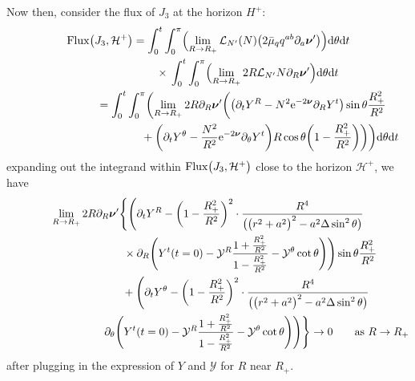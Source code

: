 \documentclass[11pt]{article}
\numberwithin{equation}{section}
\def\ptl{\partial}%
\def\mbo#1{\boldsymbol{#1}}%
\numberwithin{equation}{section}
\begin{document}
Now then, consider the flux of $J_3$ at the horizon $H^+$:
\begin{gather*}
{\rm Flux} \bigl(J_3, \mathcal{H}^+\bigr) = \int^t_0 \int^\pi _0 \Bigl(\lim_{R \to R_+} \mathcal{L}_{N'} (N) \bigl(2 \bar{\mu}_q q^{ab} \ptl_a \mbo{\nu}'\bigr) \Bigr) {\rm d}\theta {\rm d}t \notag\\
 \hphantom{{\rm Flux} \bigl(J_3, \mathcal{H}^+\bigr) =}{}
\times{}\int^t_0 \int^\pi_0 \Bigl(\lim_{R \to R_+} 2 R \mathcal{L}_{N'} N \ptl_R \mbo{\nu}' \Bigr) {\rm d}\theta {\rm d}t \notag\\
 \hphantom{{\rm Flux} \bigl(J_3, \mathcal{H}^+\bigr)}{}
= \int^t_0 \int^\pi _0 \biggl(\lim_{R \to R_+} 2 R \ptl_R \mbo{\nu}' \biggl(\bigl(\ptl_t Y^R - N^2 {\rm e}^{-2 \mbo{\nu}} \ptl_R Y^t\bigr) \sin \theta \frac{R^2_+}{R^2} \notag\\
 \hphantom{{\rm Flux} \bigl(J_3, \mathcal{H}^+\bigr)= \int^t_0 \int^\pi _0 \biggl(}{}
 + \biggl(\ptl_t Y^\theta - \frac{N^2}{R^2} {\rm e}^{-2 \mbo{\nu}} \ptl_\theta Y^t\biggr) R \cos \theta \biggl(1-\frac{R^2_+}{R^2}\biggr) \biggr) \biggr) {\rm d}\theta {\rm d}t
\end{gather*}
expanding out the integrand within $ {\rm Flux} \bigl(J_3, \mathcal{H}^+\bigr)$ close to the horizon $\mathcal{H}^+$, we have
\begin{gather*}
 \lim_{R \to R_+} 2R \ptl_R \mbo{\nu}' \Bigg\{ \Biggl(\ptl_t Y^R - \biggl(1 - \frac{R^2_+}{R^2} \biggr)^2 \cdot \frac{R^4}{ \bigl(\bigl(r^2+a^2\bigr)^2 -a^2 \Delta \sin^2 \theta\bigr)} \\
 \hphantom{\lim_{R \to R_+} 2R \ptl_R \mbo{\nu}' \Bigg\{\Biggl(}{}
 \times \ptl_R \Biggl(Y^t(t=0) - \mathcal{Y}^R \frac{1+ \frac{R^2_+}{R^2}}{1-\frac{R^2_+}{R^2}} - \mathcal{Y}^\theta \cot \theta \Biggr) \Biggr)\sin \theta \frac{R^2_+}{R^2} \notag\\
\hphantom{\lim_{R \to R_+} 2R \ptl_R \mbo{\nu}' \Bigg\{ }{}
 + \Biggl( \ptl_t Y^\theta - \biggl(1- \frac{R^2_+}{R^2}\biggr)^2 \cdot \frac{R^4}{ \bigl(\bigl(r^2+a^2\bigr)^2 -a^2 \Delta
	\sin^2 \theta \bigr)} \notag\\
\hphantom{\lim_{R \to R_+} 2R \ptl_R \mbo{\nu}' \Bigg\{ + \Biggl(}{}
 \ptl_\theta \Biggl(Y^t (t=0) - \mathcal{Y}^R \frac{1 + \frac{R^2_+}{R^2}} {{1-\frac{R^2_+}{R^2}} } - \mathcal{Y}^ \theta \cot \theta \Biggr) \Biggr) \Bigg\} \to 0 \qquad \text{as} \ R \to R_+
\end{gather*}
after plugging in the expression of $Y$ and $\mathcal{Y}$ for $R$ near $R_+$.
\end{document}
